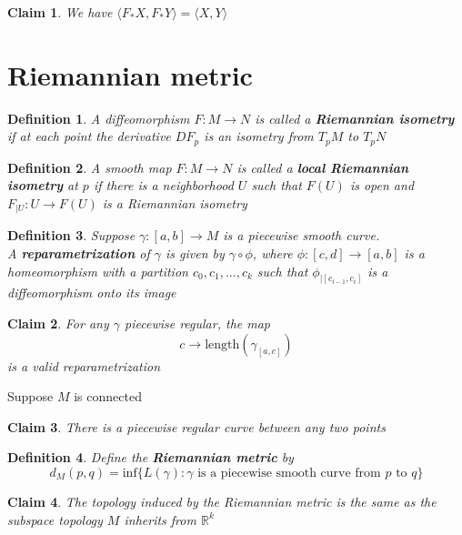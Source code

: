 \documentclass{article}
\newtheorem{definition}{Definition}
\newtheorem{claim}{Claim}
\begin{document}
\begin{claim}
    We have $\langle F_*X , F_*Y \rangle = \langle X , Y \rangle $
\end{claim}

\section{Riemannian metric}

\begin{definition}
    A diffeomorphism $F:M \to N$ is called a \textbf{Riemannian isometry} if at each point the derivative $DF_p$ is an isometry from $T_pM$ to $T_pN$
\end{definition}

\begin{definition}
    A smooth map $F: M \to N$ is called a \textbf{local Riemannian isometry} at $p$ if there is a neighborhood $U$ such that $F(U)$ is open and $F_{|U}:U \to F(U)$ is a Riemannian isometry
\end{definition}

\begin{definition}
    Suppose $\gamma:[a,b] \to M$ is a piecewise smooth curve. \\ A \textbf{reparametrization} of $\gamma$ is given by $\gamma \circ \phi$, where $\phi:[c,d] \to [a,b]$ is a homeomorphism with a partition $c_0,c_1,\dots,c_k$ such that $\phi_{|[c_{i-1},c_i]}$ is a diffeomorphism onto its image
\end{definition}

\begin{claim}
    For any $\gamma$ piecewise regular, the map \[c \to \text{length}(\gamma_{[a,c]})\] is a valid reparametrization
\end{claim}

Suppose $M$ is connected

\begin{claim}
    There is a piecewise regular curve between any two points
\end{claim}

\begin{definition}
    Define the \textbf{Riemannian metric} by \[d_M(p,q)=\text{inf}\{L(\gamma):\gamma \text{ is a piecewise smooth curve from }p \text{ to }q\}\]
\end{definition}

\begin{claim}
    The topology induced by the Riemannian metric is the same as the subspace topology $M$ inherits from $\mathbb{R}^k$
\end{claim}
\end{document}
